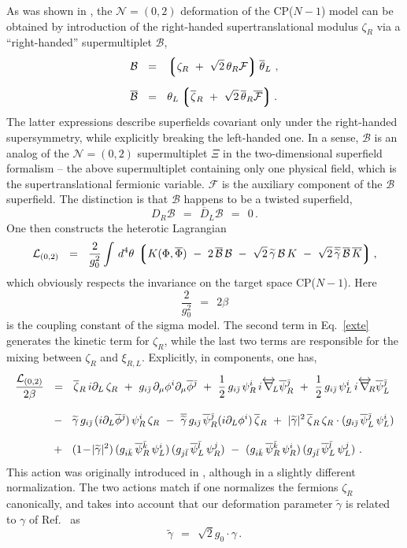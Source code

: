 \documentclass[12pt]{article}
\def\beq{\begin{equation}}
\def\eeq{\end{equation}}
\newcommand{\ntwoo}{${\mathcal N}= \left(0,2\right) $ }
\newcommand{\p}{\partial}
\newcommand{\wt}{\widetilde}
\newcommand{\ov}{\overline}
\newcommand{\mc}[1]{\mathcal{#1}}
\newcommand{\lgr}{\left\lgroup}
\newcommand{\rgr}{\right\rgroup}
\newcommand{\bzr}{\ov{\zeta}{}_R}
\newcommand{\zr}{\zeta_R}
\newcommand{\tgamma}{\wt{\gamma}}
\newcommand{\bj}{{\bar \jmath}}
\newcommand{\bk}{{\bar k}}
\newcommand{\bl}{{\bar l}}
\begin{document}
	As was shown in \cite{SYhet},  the \ntwoo deformation of the CP($N-1$) model can be obtained by
	introduction of the right-handed supertranslational modulus $ \zeta_R $ via a ``right-handed'' 
	supermultiplet $ \mc{B} $,
\begin{align*}
%
	\mc{B} & ~~=~~ \lgr \zr ~+~ \sqrt{2}\,\theta_R\mc{F} \rgr \ov{\theta}{}_L~, \\[2mm]
%
	\ov{\mc{B}} & ~~=~~ \theta_L \lgr \bzr ~+~ \sqrt{2}\, \ov{\theta}{}_R \ov{\mc{F}} \rgr.
\end{align*}
	The latter expressions describe superfields covariant only under the right-handed supersymmetry, 
	while explicitly breaking the left-handed one.
	In a sense, $ \mc{B} $ is an analog of the \ntwoo supermultiplet $\Xi$ in the two-dimensional 
	superfield formalism \cite{Edalati} --
	the above supermultiplet containing only one physical field, which is the supertranslational
	fermionic variable. ${\mathcal F}$ is the auxiliary component of the $\mc{B}$ superfield.
	The distinction is that $ \mc{B} $ happens to be a twisted superfield,
\[
	D_R \mc{B} ~~=~~ \ov{D}_L\mc{B} ~~=~~ 0\,.
\]
One then constructs the heterotic Lagrangian
\beq
\label{exte}
	\mc{L}_{(0,2)} ~~=~~ \frac{2}{g_0^2} \int\, d^4\theta\, \lgr K(\Phi,\ov{\Phi}) 
		~-~ 2\, \ov{\mc{B}}\,\mc{B}  
		~-~  \sqrt{2}\, \tgamma\,\mc{B}\,K  ~-~ \sqrt{2}\, \ov{\tgamma}\,\ov{\mc{B}}\,\ov{K} \rgr,
\eeq
	which obviously respects the invariance on the target space CP($N-1$).
	Here
\[	
	\frac{2}{g_0^2} ~~=~~ 2 \beta
\]
	is the coupling constant of the sigma model.
	The second term in Eq.~\eqref{exte} generates the kinetic term for $ \zr $, while the last two terms 
	are responsible for the mixing between $ \zr $ and $ \xi_{R,L} $.
	Explicitly, in components, one has,
\begin{align}
%
\notag
	\frac{\mc{L}_{(0,2)}}{2\beta} & ~~=~~  \bzr\, i\p_L\, \zr 
			~+~ g_{i\bj}\,\p_\mu \phi^i \p_\mu\ov{\phi}{}^\bj
			~+~ \frac{1}{2}\, g_{i\bj}\, \psi^i_R\, i\overleftrightarrow{\nabla}{}_{\!\!L} \ov{\psi}{}^\bj_R 
			~+~ \frac{1}{2}\, g_{i\bj}\, \psi^i_L\, i\overleftrightarrow{\nabla}{}_{\!\!R} \ov{\psi}{}^\bj_L 
	\\[3mm]
%
\label{cpn-1g}
			& 
			~~-~~ \tgamma\, g_{i\bj}\, (i \p_L \ov{\phi}{}^\bj)\, \psi_R^i\, \zr
			~-~ \ov{\tgamma}\, g_{i\bj}\, \ov{\psi}{}_R^\bj (i \p_L \phi^i)\, \bzr
			~+~ |\tgamma|^2\, \bzr\,\zr \cdot ( g_{i\bj}\, \ov{\psi}{}_L^\bj\, \psi_L^i )
	\\[3mm]
%
\notag
			& 
			~~+~~ (1 \!-\! |\tgamma|^2)\, (g_{i\bk}\, \ov{\psi}{}_R^\bk\, \psi_L^i)\,
						     (g_{j\bl}\, \ov{\psi}{}_L^\bl\, \psi_R^j)
			~-~ (g_{i\bk}\, \ov{\psi}{}_R^\bk\, \psi_R^i)\, (g_{j\bl}\, \ov{\psi}{}_L^\bl\, \psi_L^j)~.
\end{align}
	This action was originally introduced in \cite{SYhet}, although in a slightly different
	normalization.
	The two actions match if one normalizes the fermions $ \zr $ canonically, and
	takes into account that our deformation parameter $ \tgamma $ is related to $ \gamma $ 
	of Ref.~\cite{SYhet} as
\[
	\tgamma ~~=~~ \sqrt{2} g_0\cdot \gamma\,.
\]
	
\end{document}
